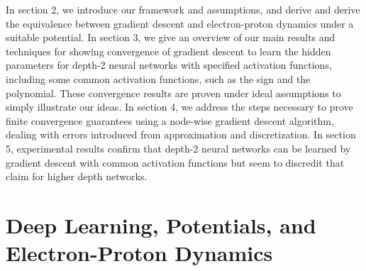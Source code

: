 \documentclass{article}
\begin{document}
In section 2, we introduce our framework and assumptions, and derive
and derive the equivalence between gradient descent and
electron-proton dynamics under a suitable potential. In section 3, we
give an overview of our main results and techniques for showing
convergence of gradient descent to learn the hidden parameters for
depth-2 neural networks with specified activation functions, including
some common activation functions, such as the sign and the
polynomial. These convergence results are proven under ideal
assumptions to simply illustrate our ideas. In section 4, we address
the steps necessary to prove finite convergence guarantees using a
node-wise gradient descent algorithm, dealing with errors introduced
from approximation and discretization. In section 5, experimental
results confirm that depth-2 neural networks can be learned by
gradient descent with common activation functions but seem to
discredit that claim for higher depth networks.


\section{Deep Learning, Potentials, and Electron-Proton Dynamics}
\end{document}

